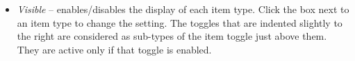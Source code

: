 \noindent
\begin{minipage}{0.6\textwidth}
  \raggedright
  \begin{itemize}
  \item{\sl Visible} --
    enables/disables the display of each item type.
    Click the box next to an item type to change the setting. The toggles that
    are indented slightly to the right are considered as sub-types of the item
    toggle just above them. They are active only if that toggle is enabled.
    \vskip1mm
  \end{itemize}
\end{minipage}%

